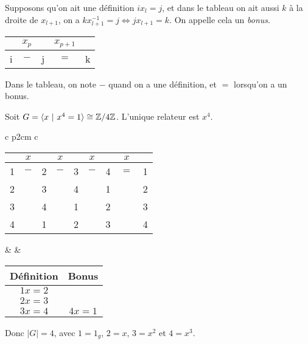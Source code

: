      \begin{rem} \label{rem:rem-2}
       Supposons qu'on ait une définition $i x_l = j$, et dans le tableau on ait aussi $k$ à la droite de
       $x_{l+1}$, on a $kx_{l+1}^{-1} = j \iff jx_{l+1} = k$. On appelle cela un \emph{bonus}. 
       \begin{center}
         \begin{tabular}{|ccccc|}
           \hline
           & $x_p$ & & $x_{p+1}$ & \\
           \hline
           i & $-$ & j & $=$ & k\\
           \hline
         \end{tabular}
       \end{center}
       Dans le tableau, on note $-$ quand on a une définition, et $=$ lorsqu'on a un bonus.
     \end{rem}


     \begin{ex}
       Soit $G = \langle x\ |\ x^4 = 1\rangle \cong \mathbb{Z}/4\mathbb{Z}$. L'unique relateur est $x^4$.
       \begin{center}
         \begin{tabular}{c p{2cm} c}
           \begin{tabular}{|ccccccccc|}
             \hline
             & $x$ & & $x$ & & $x$ & & $x$ &  \\
             \hline
             1 & $-$ & 2 & $-$ & 3 & $-$ & 4 & $=$ & 1\\
             2 & & 3 & & 4 & & 1 & & 2\\
             3 & & 4 & & 1 & & 2 & & 3\\
             4 & & 1 & & 2 & & 3 & & 4\\
             \hline
           \end{tabular}
           & & 
               \begin{tabular}{|c|c|}
                 \hline
                 Définition & Bonus\\
                 \hline
                 $1x = 2$ & \\
                 $2x = 3$ & \\
                 $3x = 4$ & $4x = 1$\\
                 \hline
               \end{tabular}
         \end{tabular}
       \end{center}
       Donc $|G| = 4$, avec $1 = 1_g$, $2 = x$, $3 = x^2$ et $4 = x^3$.
     \end{ex}

